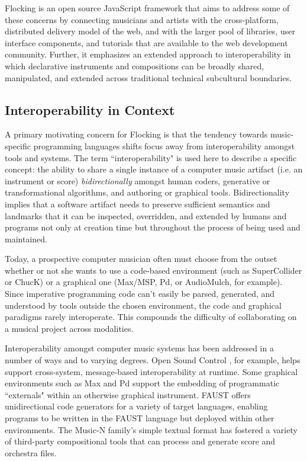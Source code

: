 \documentclass{article}
\begin{document}
Flocking is an open source JavaScript framework that aims to address some of these concerns by connecting musicians and artists with the cross-platform, distributed delivery model of the web, and with the larger pool of libraries, user interface components, and tutorials that are available to the web development community. Further, it emphasizes an extended approach to interoperability in which declarative instruments and compositions can be broadly shared, manipulated, and extended across traditional technical subcultural boundaries.

\subsection{Interoperability in Context}

A primary motivating concern for Flocking is that the tendency towards music-specific programming languages shifts focus away from interoperability amongst tools and systems. The term ``interoperability" is used here to describe a specific concept: the ability to share a single instance of a computer music artifact (i.e. an instrument or score) {\it bidirectionally} amongst human coders, generative or transformational algorithms, and authoring or graphical tools. Bidirectionality implies that a software artifact needs to preserve sufficient semantics and landmarks that it can be inspected, overridden, and extended by humans and programs not only at creation time but throughout the process of being used and maintained.

Today, a prospective computer musician often must choose from the outset whether or not she wants to use a code-based environment (such as SuperCollider or ChucK) or a graphical one (Max/MSP, Pd, or AudioMulch, for example). Since imperative programming code can't easily be parsed, generated, and understood by tools outside the chosen environment, the code and graphical paradigms rarely interoperate. This compounds the difficulty of collaborating on a musical project across modalities.

Interoperability amongst computer music systems has been addressed in a number of ways and to varying degrees. Open Sound Control \cite{wright1997open}, for example, helps support cross-system, message-based interoperability at runtime. Some graphical environments such as Max and Pd support the embedding of programmatic ``externals" within an otherwise graphical instrument. FAUST offers unidirectional code generators for a variety of target languages, enabling programs to be written in the FAUST language but deployed within other environments. The Music-N family's simple textual format has fostered a variety of third-party compositional tools that can process and generate score and orchestra files.
\end{document}

